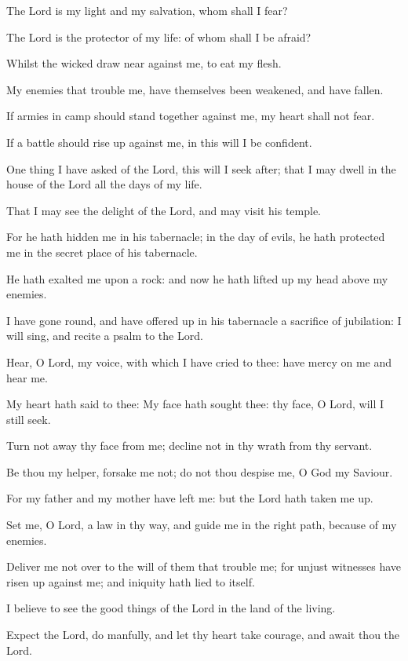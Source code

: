 ﻿\item The Lord is my light and my salvation, whom shall I fear?
\item The Lord is the protector of my life: of whom shall I be afraid?
\item Whilst the wicked draw near against me, to eat my flesh.
\item My enemies that trouble me, have themselves been weakened, and have fallen.
\item If armies in camp should stand together against me, my heart shall not fear.
\item If a battle should rise up against me, in this will I be confident.
\item One thing I have asked of the Lord, this will I seek after; that I may dwell in the house of the Lord all the days of my life.
\item That I may see the delight of the Lord, and may visit his temple.
\item For he hath hidden me in his tabernacle; in the day of evils, he hath protected me in the secret place of his tabernacle.
\item He hath exalted me upon a rock: and now he hath lifted up my head above my enemies.
\item I have gone round, and have offered up in his tabernacle a sacrifice of jubilation: I will sing, and recite a psalm to the Lord.
\item Hear, O Lord, my voice, with which I have cried to thee: have mercy on me and hear me.
\item My heart hath said to thee: My face hath sought thee: thy face, O Lord, will I still seek.
\item Turn not away thy face from me; decline not in thy wrath from thy servant.
\item Be thou my helper, forsake me not; do not thou despise me, O God my Saviour.
\item For my father and my mother have left me: but the Lord hath taken me up.
\item Set me, O Lord, a law in thy way, and guide me in the right path, because of my enemies.
\item Deliver me not over to the will of them that trouble me; for unjust witnesses have risen up against me; and iniquity hath lied to itself.
\item I believe to see the good things of the Lord in the land of the living.
\item Expect the Lord, do manfully, and let thy heart take courage, and await thou the Lord.
